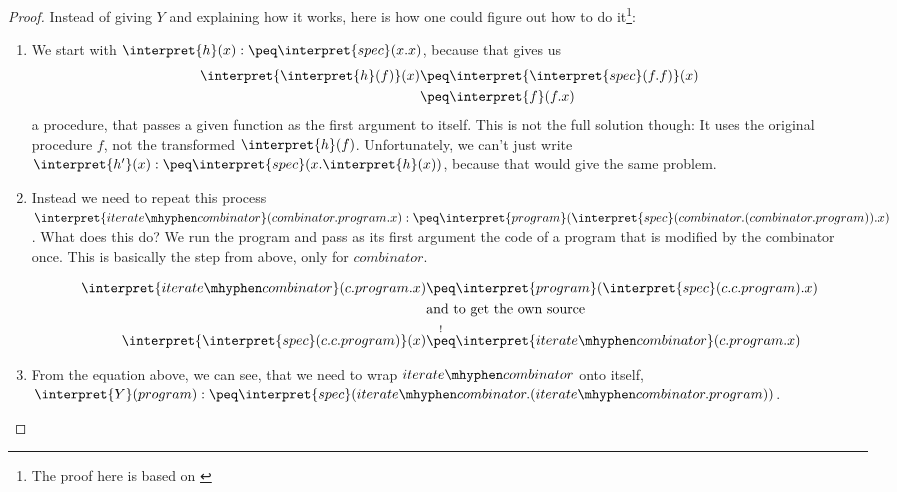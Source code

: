 \begin{proof}
	\TODO {}

	Instead of giving $Y$ and explaining how it works, here is how one could 
	figure out how to do it\footnote{The proof here is based on \cite{dalenrecursion}}:

	\begin{enumerate}
		\item We start with $\interpret{h}(x):\peq \interpret{spec}(x.x)$, 
			because that gives us 
			\begin{equation*}
				\begin{split}
					\interpret{\interpret{h}(f)}(x)
					&\peq \interpret{\interpret{spec}(f.f)}(x)\\
					&\peq \interpret{f}(f.x)
				\end{split}
			\end{equation*}
			a procedure, that passes a given function as the first argument to 
			itself. This is not the full solution though: It uses the original 
			procedure $f$, not the transformed $\interpret{h}(f)$. Unfortunately, 
			we can't just write 
			$\interpret{h'}(x):\peq \interpret{spec}(x.\interpret{h}(x))$, because 
			that would give the same problem. 
		\item Instead we need to repeat this process 
			$\interpret{iterate\mhyphen combinator}(combinator.program.x):\peq 
			\interpret{program}(\interpret{spec}(combinator.(combinator.program)).x)$. 
			What does this do? We run the program and pass as its first argument 
			the code of a program that is modified by the combinator once. This is 
			basically the step from above, only for $combinator$.

			\begin{equation*}
				\begin{split}
					\interpret{iterate\mhyphen combinator}(c.program.x)
					&\peq \interpret{program}(\interpret{spec}(c.c.program).x) \\
					&\text{and to get the own source}\\
					\interpret{\interpret{spec}(c.c.program)}(x)
					&\overset{!}{\peq} \interpret{iterate\mhyphen combinator}(c.program.x)
				\end{split}
			\end{equation*}
		\item From the equation above, we can see, that we need to wrap
			$iterate\mhyphen combinator$ onto itself, 
			$\interpret{Y}(program):\peq \interpret{spec}(iterate\mhyphen
			combinator.(iterate\mhyphen combinator.program))$. 


\end{enumerate}
\end{proof}
